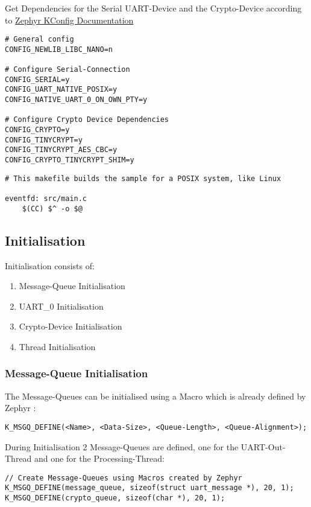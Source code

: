 Get Dependencies for the Serial UART-Device and the Crypto-Device
according to
\href{https://docs.zephyrproject.org/2.4.0/reference/kconfig/index-all.html}
{Zephyr KConfig Documentation}

\begin{lstlisting}[caption=prj.conf]
# General config
CONFIG_NEWLIB_LIBC_NANO=n

# Configure Serial-Connection
CONFIG_SERIAL=y
CONFIG_UART_NATIVE_POSIX=y
CONFIG_NATIVE_UART_0_ON_OWN_PTY=y

# Configure Crypto Device Dependencies
CONFIG_CRYPTO=y
CONFIG_TINYCRYPT=y
CONFIG_TINYCRYPT_AES_CBC=y
CONFIG_CRYPTO_TINYCRYPT_SHIM=y
\end{lstlisting}

\begin{lstlisting}[caption=Makefile.posix]
# This makefile builds the sample for a POSIX system, like Linux

eventfd: src/main.c
	$(CC) $^ -o $@
\end{lstlisting}

\pagebreak

\subsection{Initialisation}

Initialisation consists of:
\begin{enumerate}
	\item Message-Queue Initialisation
	\item UART\_0 Initialisation
	\item Crypto-Device Initialisation
	\item Thread Initialisation
\end{enumerate}

\subsubsection{Message-Queue Initialisation}

The Message-Queues can be initialised using a Macro which
is already defined by Zephyr :
\\
\begin{lstlisting}[style=CStyle, caption=Message Queue Initialisation]
K_MSGQ_DEFINE(<Name>, <Data-Size>, <Queue-Length>, <Queue-Alignment>);
\end{lstlisting}
During Initialisation 2 Message-Queues are defined, one for
the UART-Out-Thread and one for the Processing-Thread:
\\
\begin{lstlisting}[style=CStyle]
// Create Message-Queues using Macros created by Zephyr
K_MSGQ_DEFINE(message_queue, sizeof(struct uart_message *), 20, 1);
K_MSGQ_DEFINE(crypto_queue, sizeof(char *), 20, 1);
\end{lstlisting}

